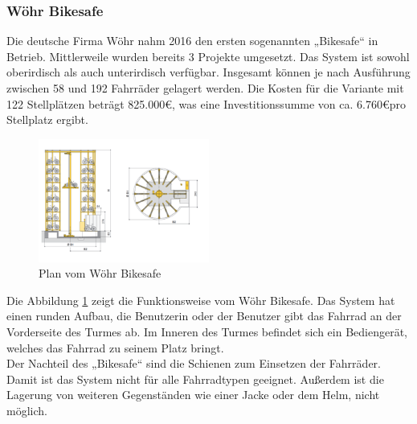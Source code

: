 \subsubsection{Wöhr Bikesafe}
Die deutsche Firma Wöhr nahm 2016 den ersten sogenannten „Bikesafe“ in Betrieb.  Mittlerweile wurden bereits 3 Projekte umgesetzt.  Das System ist sowohl oberirdisch als auch unterirdisch verfügbar. Insgesamt können je nach Ausführung zwischen 58 und 192 Fahrräder gelagert werden. Die Kosten für die Variante mit 122 Stellplätzen beträgt 825.000\euro, was eine Investitionssumme von ca. 6.760\euro pro Stellplatz ergibt.\cite*{richtpreisangebot} \\

\begin{figure}[H]
  \centering
  \includegraphics[width=0.5\textwidth]{images/bikesafe.png}
  \caption{Plan vom Wöhr Bikesafe }
  \label{fig:bikesafe}
\end{figure}

Die Abbildung \ref{fig:bikesafe} zeigt die Funktionsweise vom Wöhr Bikesafe. Das System hat einen runden Aufbau, die Benutzerin oder der Benutzer gibt das Fahrrad an der Vorderseite des Turmes ab. Im Inneren des Turmes befindet sich ein Bediengerät, welches das Fahrrad zu seinem Platz bringt.\\
Der Nachteil des „Bikesafe“ sind die Schienen zum Einsetzen der Fahrräder. Damit ist das System nicht für alle Fahrradtypen geeignet. Außerdem ist die Lagerung von weiteren Gegenständen wie einer Jacke oder dem Helm, nicht möglich.\\
